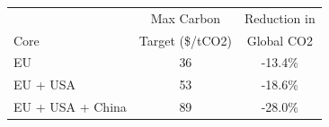 \begin{tabular}{lcc}
\toprule
     & Max Carbon & Reduction in \\
Core & Target (\$/tCO2) & Global CO2 \\
\midrule
EU & 36 & -13.4\% \\
EU + USA & 53 & -18.6\% \\
EU + USA + China & 89 & -28.0\% \\
\bottomrule
\end{tabular}
